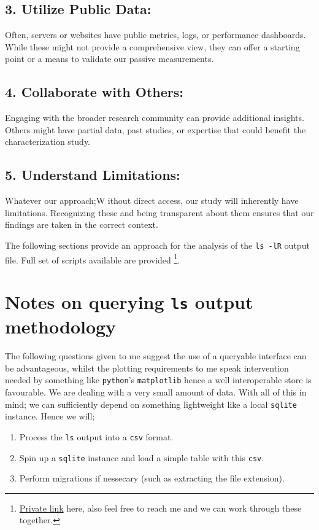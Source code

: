 \documentclass{article}
\begin{document}
\subsection*{3. Utilize Public Data:} 
Often, servers or websites have public metrics, logs, or performance dashboards. While these might not provide a comprehensive view, they can offer a starting point or a means to validate our passive measurements.

\subsection*{4. Collaborate with Others:} 
Engaging with the broader research community can provide additional insights. Others might have partial data, past studies, or expertise that could benefit the characterization study.

\subsection*{5. Understand Limitations:} 
Whatever our approach;W ithout direct access, our study will inherently have limitations. Recognizing these and being transparent about them ensures that our findings are taken in the correct context.

\newpage
The following sections provide an approach for the analysis of the \texttt{ls -lR} output file. Full set of scripts available are provided \footnote{\href{https://gitfront.io/r/user-5047466/ZFVr4eV9CukU/cs742-published-scripts/}{Private link} here, also feel free to reach me and we can work through these together.}.
\section*{Notes on querying \texttt{ls} output methodology}
The following questions given to me suggest the use of a queryable interface can be advantageous, whilst the plotting requirements to me speak intervention needed by something like \texttt{python}'s \texttt{matplotlib} hence a well interoperable store is favourable. We are dealing with a very small amount of data.  With all of this in mind; we can sufficiently depend on something lightweight like a local \texttt{sqlite} instance. Hence we will;

\begin{enumerate}
				\item Process the \texttt{ls} output into a \texttt{csv} format.
				\item Spin up a \texttt{sqlite} instance and load a simple table with this \texttt{csv}.
				\item Perform migrations if nessecary (such as extracting the file extension).
\end{enumerate}
\end{document}
